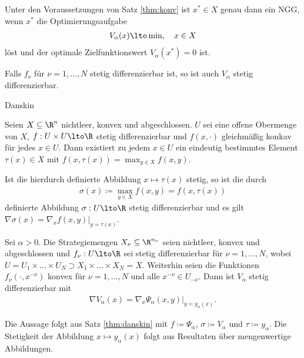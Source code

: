 \begin{korollar}
   Unter den Voraussetzungen von Satz \ref{thm:konv} ist $x^{*} \in X$ genau dann ein NGG, wenn $x^{*}$ die Optimierungsaufgabe
   \begin{align}\label{eq:min_v}
     V_{\alpha}(x) \lto \min, \quad x \in X
   \end{align}
löst und der optimale Zielfunktionswert $V_{\alpha}(x^{*}) = 0$ ist. 
\end{korollar}
Falls $f_{\nu}$ für $\nu = 1, \dots, N$ stetig differenzierbar ist, so ist auch $V_{\alpha}$ stetig differenzierbar.
\begin{satz}\label{thm:danskin} Danskin
  
  Seien $X \subseteq \R^{n}$ nichtleer, konvex und abgeschlossen. $U$ sei eine offene Obermenge von $X$, $f: U \times U \lto \R$ stetig differenzierbar und $f(x, \cdot)$ gleichmäßig konkav für jedes $x \in U$. Dann existiert zu jedem $x \in U$ ein eindeutig bestimmtes Element $\tau(x) \in X$ mit $f(x, \tau(x)) = \max_{y \in X} f(x, y)$. 

Ist die hierdurch definierte Abbildung $x \mapsto \tau(x)$ stetig, so ist die durch
\begin{align*}
  \sigma(x) \coloneqq \max_{y \in X} f(x, y) = f(x, \tau(x))
\end{align*}
definierte Abbildung $\sigma: U \lto \R$ stetig differenzierbar und es gilt $\nabla \sigma (x) =\left. \nabla_{x}f(x, y)\right|_{y = \tau(x)}$. 
\end{satz}
\begin{satz}
Sei $\alpha > 0$. Die Strategiemengen $X_{\nu} \subseteq \R^{n_{\nu}}$ seien nichtleer, konvex und abgeschlossen und $f_{\nu}: U \lto \R$ sei stetig differenzierbar für $\nu = 1, \dots, N$, wobei $U = U_{1} \times \dots \times U_{N} \supset X_{1} \times \dots \times X_{N} = X$. Weiterhin seien die Funktionen $f_{\nu}(\cdot, x^{-\nu})$ konvex für $\nu = 1, \dots, N$ und alle $x^{-\nu} \in U_{-\nu}$. Dann ist $V_{\alpha}$ stetig differenzierbar mit
\begin{align*}
  \nabla V_{\alpha}(x) = \left.\nabla_{x} \Psi_{\alpha} (x, y)\right|_{y = y_{\alpha}(x)}.
\end{align*}
\end{satz}
\begin{beweis}
  Die Aussage folgt aus Satz \ref{thm:danskin} mit $f\coloneqq \Psi_{\alpha}$, $\sigma \coloneqq V_{\alpha}$ und $\tau \coloneqq y_{\alpha}$. Die Stetigkeit der Abbildung $x \mapsto y_{\alpha}(x)$ folgt aus Resultaten über mengenwertige Abbildungen. 
\end{beweis}
